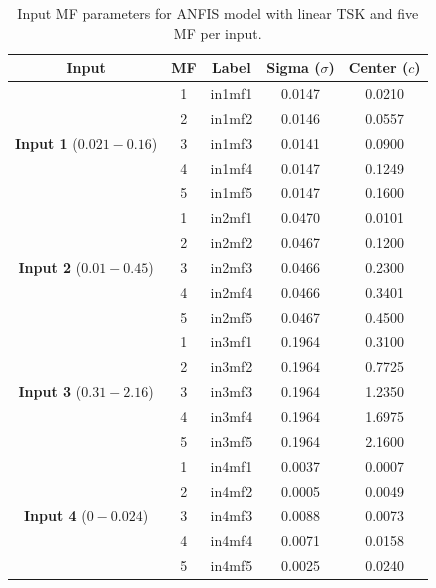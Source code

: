 \documentclass[12pt]{article}
\begin{document}

\begin{table}[H]
\centering
\caption{Input Membership Function Parameters (Gaussian)}
\begin{tabular}{|c|c|c|c|c|}
\hline
\textbf{Input} & \textbf{MF} & \textbf{Label} & \textbf{Sigma ($\sigma$)} & \textbf{Center ($c$)} \\ \hline
\multirow{5}{*}{\textbf{Input 1} ($0.021 - 0.16$)} 
 & 1 & in1mf1 & 0.0147 & 0.0210 \\ \cline{2-5} 
 & 2 & in1mf2 & 0.0146 & 0.0557 \\ \cline{2-5} 
 & 3 & in1mf3 & 0.0141 & 0.0900 \\ \cline{2-5} 
 & 4 & in1mf4 & 0.0147 & 0.1249 \\ \cline{2-5} 
 & 5 & in1mf5 & 0.0147 & 0.1600 \\ \hline
\hline
\multirow{5}{*}{\textbf{Input 2} ($0.01 - 0.45$)} 
 & 1 & in2mf1 & 0.0470 & 0.0101 \\ \cline{2-5} 
 & 2 & in2mf2 & 0.0467 & 0.1200 \\ \cline{2-5} 
 & 3 & in2mf3 & 0.0466 & 0.2300 \\ \cline{2-5} 
 & 4 & in2mf4 & 0.0466 & 0.3401 \\ \cline{2-5} 
 & 5 & in2mf5 & 0.0467 & 0.4500 \\ \hline
\hline
\multirow{5}{*}{\textbf{Input 3} ($0.31 - 2.16$)} 
 & 1 & in3mf1 & 0.1964 & 0.3100 \\ \cline{2-5} 
 & 2 & in3mf2 & 0.1964 & 0.7725 \\ \cline{2-5} 
 & 3 & in3mf3 & 0.1964 & 1.2350 \\ \cline{2-5} 
 & 4 & in3mf4 & 0.1964 & 1.6975 \\ \cline{2-5} 
 & 5 & in3mf5 & 0.1964 & 2.1600 \\ \hline
\hline
\multirow{5}{*}{\textbf{Input 4} ($0 - 0.024$)} 
 & 1 & in4mf1 & 0.0037 & 0.0007 \\ \cline{2-5} 
 & 2 & in4mf2 & 0.0005 & 0.0049 \\ \cline{2-5} 
 & 3 & in4mf3 & 0.0088 & 0.0073 \\ \cline{2-5} 
 & 4 & in4mf4 & 0.0071 & 0.0158 \\ \cline{2-5} 
 & 5 & in4mf5 & 0.0025 & 0.0240 \\ \hline
\end{tabular}
\label{tab:inputtable}
\caption{Input MF parameters for ANFIS model with linear TSK and five MF per input. }
\end{table}
\end{document}
